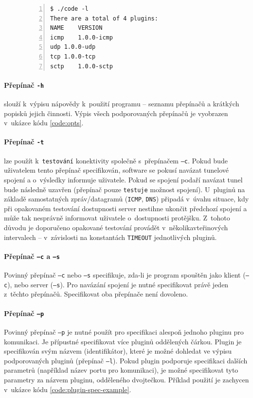 \documentclass[thesis=M,czech]{FITthesis}[2012/10/20]
\begin{document}
    \begin{figure}[h]
	\begin{lstlisting}[label=code:listplugins,caption=Výpis jmen a verzí podporovaných pluginů,frame=single,numbers=left]
$ ./code -l
There are a total of 4 plugins:
NAME	VERSION
icmp	1.0.0-icmp
udp	1.0.0-udp
tcp	1.0.0-tcp
sctp	1.0.0-sctp
      \end{lstlisting}
    \end{figure}
    
    \paragraph{Přepínač \texttt{-h}} slouží k~výpisu nápovědy k~použití programu -- seznamu přepínačů a krátkých popisků jejich činnosti. Výpis všech podporovaných přepínačů je vyobrazen v~ukázce kódu \ref{code:opts}.
    
    \paragraph{Přepínač \texttt{-t}} lze použít k~\texttt{testování} konektivity společně s~přepínačem \texttt{--c}. Pokud bude uživatelem tento přepínač specifikován, software se pokusí navázat tunelové spojení a o~výsledky informuje uživatele. Pokud se spojení podaří navázat tunel bude následně uzavřen (přepínač pouze \texttt{testuje} možnost spojení). U~pluginů na základě samostatných zpráv/datagramů (\texttt{ICMP}, \texttt{DNS}) připadá v~úvahu situace, kdy při opakovaném testování dostupnosti server nestihne ukončit předchozí spojení a může tak nesprávně informovat uživatele o~dostupnosti protějšku. Z~tohoto důvodu je doporučeno opakované testování provádět v~několikavteřinových intervalech -- v~závislosti na konstantách \texttt{TIMEOUT} jednotlivých pluginů.
    
    \paragraph{Přepínač \texttt{--c} a \texttt{--s}} Povinný přepínač \texttt{--c} nebo \texttt{--s} specifikuje, zda-li je program spouštěn jako klient (\texttt{--c}), nebo server (\texttt{--s}). Pro navázání spojení je nutné specifikovat právě jeden z~těchto přepínačů. Specifikovat oba přepínače není dovoleno.
    
    \paragraph{Přepínač \texttt{--p}} Povinný přepínač \texttt{--p} je nutné použít pro specifikaci alespoň jednoho pluginu pro komunikaci. Je přípustné specifikovat více pluginů oddělených čárkou. Plugin je specifikován svým názvem (identifikátor), které je možné dohledat ve výpisu podporovaných pluginů (přepínač \texttt{--l}). Pokud plugin podporuje specifikaci dalších parametrů (například název portu pro komunikaci), je možné specifikovat tyto parametry za názvem pluginu, odděleného dvojtečkou. Příklad použití je zachycen v~ukázce kódu \ref{code:plugin-spec-example}.
    
\end{document}
